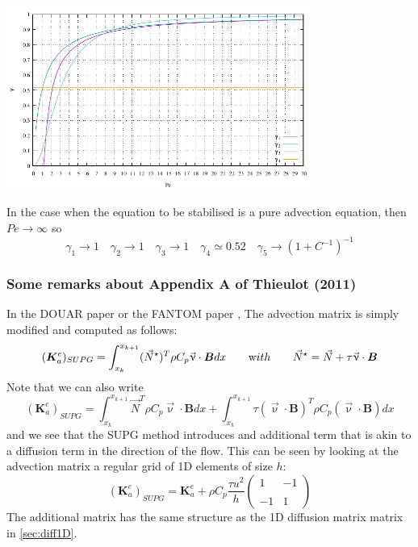 \begin{center}
\includegraphics[width=10cm]{images/supg/gamma} 
\end{center}

In the case when the equation to be stabilised is a pure advection equation, 
then $Pe\rightarrow \infty$ so 
\[
\gamma_1 \rightarrow 1  \quad
\gamma_2 \rightarrow 1 \quad
\gamma_3 \rightarrow 1 \quad
\gamma_4 \simeq 0.52 \quad
\gamma_5 \rightarrow (1+C^{-1})^{-1} 
\]






\subsubsection{Some remarks about Appendix A of Thieulot (2011) \cite{thie11}}


In the DOUAR paper \cite{brtf08} or the FANTOM paper \cite{thie11},
The advection matrix is simply modified and computed as follows:
\[
({\bm K}_a^e)_{SUPG}
=
\int_{x_k}^{x_{k+1}}   ({\vec N}^\star)^T \rho C_p \vec\upnu \cdot {\bm B} dx  
\quad\quad
{\text with}
\quad\quad
{\vec N}^\star= {\vec N} + \tau \vec \upnu \cdot {\bm B}
\]
Note that we can also write 
\[
({\bm K}_a^e)_{SUPG}
=
\int_{x_k}^{x_{k+1}}   {\vec N}^T \rho C_p \vec\upnu \cdot {\bm B} dx  
+
\int_{x_k}^{x_{k+1}}  \tau (\vec \upnu \cdot {\bm B})^T   \rho C_p (\vec\upnu \cdot {\bm B}) dx  
\]
and we see that the SUPG method introduces and additional term that is akin to 
a diffusion term in the direction of the flow.
This can be seen by looking at the advection matrix a regular grid of 1D 
elements of size $h$:
\[
({\bm K}_a^e)_{SUPG}=
{\bm K}_a^e
+
\rho C_p
\frac{\tau u^2}{h}
\left(
\begin{array}{cc}
1 & -1 \\ \\
-1 & 1
\end{array}
\right)
\]
The additional matrix has the same structure as the 1D diffusion matrix matrix in \ref{sec:diff1D}.

